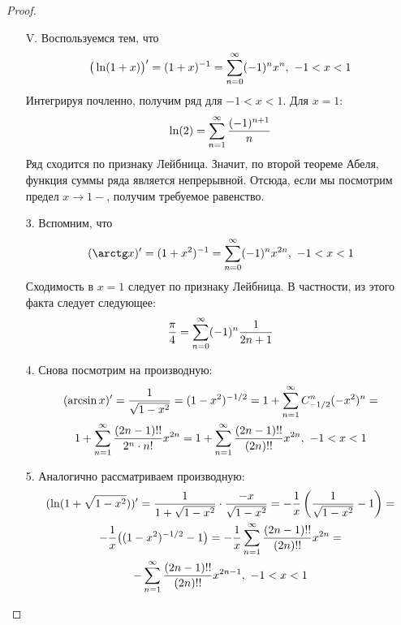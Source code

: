 \begin{proof}
\begin{enumerate}
		\item[V.] Воспользуемся тем, что
		\[
			\big(\ln (1 + x)\big)' = (1 + x)^{-1} = \sum\limits_{n = 0}^\infty (-1)^n x^n,\ -1 < x < 1
		\]
		Интегрируя почленно, получим ряд для $-1 < x < 1$. Для $x = 1$:
		\[
			\ln (2) = \sum\limits_{n = 1}^\infty \frac{(-1)^{n + 1}}{n}
		\]
		Ряд сходится по признаку Лейбница. Значит, по второй теореме Абеля, функция суммы ряда является непрерывной. Отсюда, если мы посмотрим предел $x \to 1-$, получим требуемое равенство.
		
		\item[3.] Вспомним, что
		\[
			(\arctg x)' = (1 + x^2)^{-1} = \suml_{n = 0}^\infty (-1)^n x^{2n},\ -1 < x < 1
		\]
		Сходимость в $x = 1$ следует по признаку Лейбница. В частности, из этого факта следует следующее:
		\[
			\frac{\pi}{4} = \sum_{n = 0}^\infty (-1)^n\frac{1}{2n + 1}
		\]
		
		\item[4.] Снова посмотрим на производную:
		\begin{multline*}
			(\arcsin x)' = \frac{1}{\sqrt{1 - x^2}} = (1 - x^2)^{-1/2} = 1 + \sum_{n = 1}^\infty C_{-1/2}^n (-x^2)^n =
			\\
			1 + \sum_{n = 1}^\infty \frac{(2n - 1)!!}{2^n \cdot n!}x^{2n} = 1 + \sum_{n = 1}^\infty \frac{(2n - 1)!!}{(2n)!!}x^{2n},\ -1 < x < 1
		\end{multline*}
		
		\item[5.] Аналогично рассматриваем производную:
		\begin{multline*}
			(\ln(1 + \sqrt{1 - x^2}))' = \frac{1}{1 + \sqrt{1 - x^2}} \cdot \frac{-x}{\sqrt{1 - x^2}} = -\frac{1}{x}\left(\frac{1}{\sqrt{1 - x^2}} - 1\right) =
			\\
			-\frac{1}{x}\big((1 - x^2)^{-1/2} - 1\big) = -\frac{1}{x}\sum_{n = 1}^\infty \frac{(2n - 1)!!}{(2n)!!}x^{2n} =
			\\
			-\sum_{n = 1}^\infty \frac{(2n - 1)!!}{(2n)!!} x^{2n - 1},\ -1 < x < 1
		\end{multline*}
	\end{enumerate}
\end{proof}